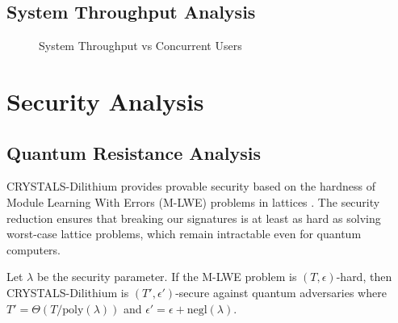\documentclass[12pt,a4paper]{article}
\begin{document}
\subsection{System Throughput Analysis}

\begin{figure}[H]
\centering
{}
\caption{System Throughput vs Concurrent Users}
\label{fig:throughput}
\end{figure}

\section{Security Analysis}

\subsection{Quantum Resistance Analysis}

CRYSTALS-Dilithium provides provable security based on the hardness of Module Learning With Errors (M-LWE) problems in lattices \cite{lyubashevsky2012lattice}. The security reduction ensures that breaking our signatures is at least as hard as solving worst-case lattice problems, which remain intractable even for quantum computers.

\begin{theorem}
Let $\lambda$ be the security parameter. If the M-LWE problem is $(T, \epsilon)$-hard, then CRYSTALS-Dilithium is $(T', \epsilon')$-secure against quantum adversaries where $T' = \Theta(T/\text{poly}(\lambda))$ and $\epsilon' = \epsilon + \text{negl}(\lambda)$.
\end{theorem}
\end{document}
